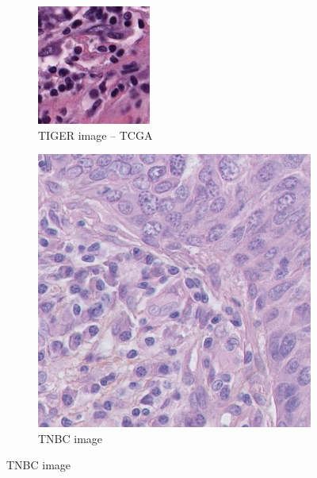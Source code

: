 \begin{figure}[H]
  \par\vspace{0.5em} %

  \begin{subfigure}[b]{0.32\textwidth}
    \centering
    \includegraphics[width=\linewidth]{assets/images/for_presentation/image_TCGA-EW-A1P8-01Z-00-DX1.E9852193-8CDD-49EF-B49B-DA6931198F0D_[8391, 13690, 8532, 13838].png}
    \caption{TIGER image – TCGA}
  \end{subfigure}\quad
  \begin{subfigure}[b]{0.32\textwidth}
    \centering
    \includegraphics[width=\linewidth]{assets/images/for_presentation/image_10_1.png}
    \caption{TNBC image}
  \end{subfigure}


\end{figure}
